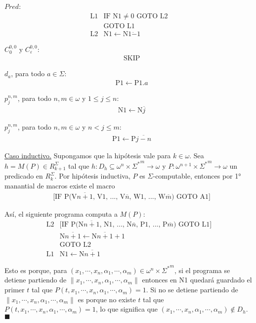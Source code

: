 \documentclass{article}
\begin{document}
\indent $Pred$:
\[
\begin{array}{ll}
\text{L1} & \text{IF N1} \neq 0 \text{ GOTO L2} \\
    & \text{GOTO L1} \\
\text{L2} & \text{N1} \leftarrow \text{N1} \dot{-} 1
\end{array}
\]

\indent $C^{0,0}_0$ y $C^{0,0}_{\varepsilon}$:
\[
\begin{array}{ll}
    & \text{SKIP}
\end{array}
\]

\indent $d_a$, para todo $a \in \Sigma$:
\[
\begin{array}{ll}
    & \text{P1} \leftarrow \text{P1}.a
\end{array}
\]

\indent $p^{n,m}_j$, para todo $n,m \in \omega$ y $1 \leq j \leq n$:
\[
\begin{array}{ll}
    & \text{N1} \leftarrow \text{N}\overline{j}
\end{array}
\]

\indent $p^{n,m}_j$, para todo $n,m \in \omega$ y $n < j \leq m$:
\[
\begin{array}{ll}
    & \text{P1} \leftarrow \text{P}\overline{j - n}
\end{array}
\]
\vspace{2em}


\underline{Caso inductivo.} Supongamos que la hipótesis vale para $k \in \omega$. Sea $h = M(P) \in R^{\Sigma}_{k+1}$ tal que $h: D_h \subseteq \omega^{n} \times {\Sigma^{*}}^{m} \rightarrow \omega$ y $P: \omega^{n+1} \times {\Sigma^{*}}^{m} \rightarrow \omega$ un predicado en $R^{\Sigma}_k$. Por hipótesis inductiva, $P$ es $\Sigma$-computable, entonces por 1° manantial de macros existe el macro
\[
\begin{array}{ll}
    & \text{[IF P(V}\overline{n+1}\text{, V1, ..., V}\overline{n}\text{, W1, ..., W}\overline{m}\text{) GOTO A1]}
\end{array}
\]

Así, el siguiente programa computa a $M(P)$:
\[
\begin{array}{ll}
\text{L2} & \text{[IF P(N}\overline{n+1}\text{, N1, ..., N}\overline{n}\text{, P1, ..., P}\overline{m}\text{) GOTO L1]} \\
    & \text{N}\overline{n+1} \leftarrow \text{N}\overline{n+1} + 1 \\
    & \text{GOTO L2} \\
\text{L1} & \text{N1} \leftarrow \text{N}\overline{n+1}
\end{array}
\]

Esto es porque, para $(x_1, \cdots, x_n, \alpha_1, \cdots, \alpha_m) \in \omega^n \times {\Sigma^*}^m$, si el programa se detiene partiendo de $\lVert x_1, \cdots, x_n, \alpha_1, \cdots, \alpha_m \rVert$ entonces en N1 quedará guardado el primer $t$ tal que $P(t, x_1, \cdots, x_n, \alpha_1, \cdots, \alpha_m) = 1$. Si no se detiene partiendo de $\lVert x_1, \cdots, x_n, \alpha_1, \cdots, \alpha_m \rVert$ es porque no existe $t$ tal que $P(t, x_1, \cdots, x_n, \alpha_1, \cdots, \alpha_m) = 1$, lo que significa que $(x_1, \cdots, x_n, \alpha_1, \cdots, \alpha_m) \notin D_h$.
\hfill $\blacksquare$
\end{document}
